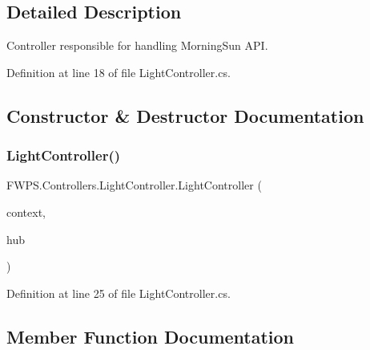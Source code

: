 \subsection{Detailed Description}
Controller responsible for handling Morning\+Sun A\+PI. 

Definition at line 18 of file Light\+Controller.\+cs.



\subsection{Constructor \& Destructor Documentation}
\mbox{\label{class_f_w_p_s_1_1_controllers_1_1_light_controller_a9d6e809f8aa95f22d5ca89d9616d6bf9}} 
\subsubsection{\texorpdfstring{Light\+Controller()}{LightController()}}
{\footnotesize\ttfamily F\+W\+P\+S.\+Controllers.\+Light\+Controller.\+Light\+Controller (\begin{DoxyParamCaption}\item[{\mbox{\hyperlink{class_f_w_p_s_1_1_data_1_1_fwps_db_context}{Fwps\+Db\+Context}}}]{context,  }\item[{I\+Hub\+Context$<$ \mbox{\hyperlink{class_f_w_p_s_1_1_devices_hub}{Devices\+Hub}} $>$}]{hub }\end{DoxyParamCaption})}



Definition at line 25 of file Light\+Controller.\+cs.



\subsection{Member Function Documentation}
\mbox{\label{class_f_w_p_s_1_1_controllers_1_1_light_controller_a0fe5a181efbc00564d0089d34dbe9249}} 
